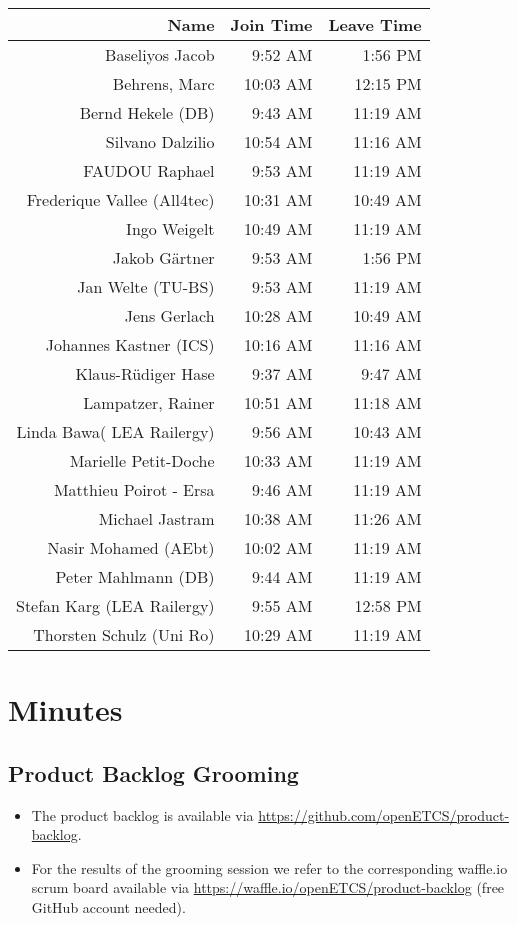 \documentclass[a4paper, 11pt]{article}
\begin{document}
\begin{table}[htbp]
    \begin{tabular}{rrr}
    \toprule
    \textbf{Name} & \textbf{Join Time} & \textbf{Leave Time} \\
    \midrule
    Baseliyos Jacob & 9:52 AM & 1:56 PM \\
    Behrens, Marc & 10:03 AM & 12:15 PM \\
    Bernd Hekele (DB) & 9:43 AM & 11:19 AM \\
    Silvano Dalzilio & 10:54 AM & 11:16 AM \\
    FAUDOU Raphael & 9:53 AM & 11:19 AM \\
    Frederique Vallee (All4tec) & 10:31 AM & 10:49 AM \\
    Ingo Weigelt & 10:49 AM & 11:19 AM \\
    Jakob G\"artner & 9:53 AM & 1:56 PM \\
    Jan Welte (TU-BS) & 9:53 AM & 11:19 AM \\
    Jens Gerlach & 10:28 AM & 10:49 AM \\
    Johannes Kastner (ICS) & 10:16 AM & 11:16 AM \\
    Klaus-R\"udiger Hase & 9:37 AM & 9:47 AM \\
    Lampatzer, Rainer & 10:51 AM & 11:18 AM \\
    Linda Bawa( LEA Railergy) & 9:56 AM & 10:43 AM \\
    Marielle Petit-Doche & 10:33 AM & 11:19 AM \\
    Matthieu Poirot - Ersa & 9:46 AM & 11:19 AM \\
    Michael Jastram & 10:38 AM & 11:26 AM \\
    Nasir Mohamed (AEbt) & 10:02 AM & 11:19 AM \\
    Peter Mahlmann (DB) & 9:44 AM & 11:19 AM \\
    Stefan Karg (LEA Railergy) & 9:55 AM & 12:58 PM \\
    Thorsten Schulz (Uni Ro) & 10:29 AM & 11:19 AM \\


     \bottomrule
    \end{tabular}%
  \label{tab:addlabel}%
\end{table}%




\section{Minutes}

\subsection{Product Backlog Grooming}
\begin{itemize}
\item The product backlog is available via 
\url{https://github.com/openETCS/product-backlog}. 
\item For the results of the grooming session we refer to the corresponding waffle.io scrum board available via \url{https://waffle.io/openETCS/product-backlog} (free GitHub account needed).
\end{itemize}
\end{document}

